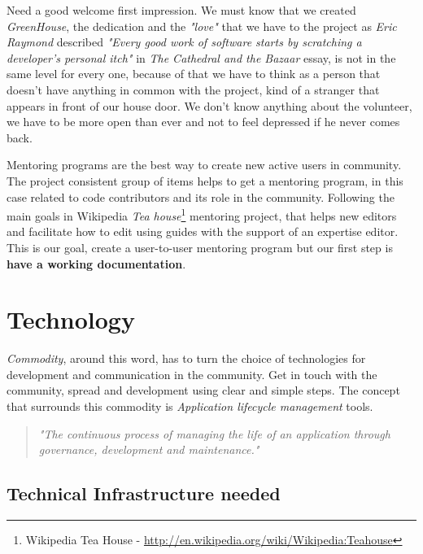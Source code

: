 \documentclass[11pt]{scrartcl}
\begin{document}
\par Need a good welcome first impression. We must know that we created \emph{GreenHouse}, the dedication and the \emph{"love"} that we have to the project as \emph{Eric Raymond} described \emph{"Every good work of software starts by scratching a developer's personal itch"} in \emph{The Cathedral and the Bazaar} essay\cite{cath-bazaar}, is not in the same level for every one, because of that we have to think as a person that doesn't have anything in common with the project, kind of a stranger that appears in front of our house door. We don't know anything about the volunteer, we have to be more open than ever and not to feel depressed if he never comes back.

\par Mentoring programs are the best way to create new active users in community. The project consistent group of items helps to get a mentoring program, in this case related to code contributors and its role in the community. Following the main goals in Wikipedia \emph{Tea house}\footnote{Wikipedia Tea House - \url{http://en.wikipedia.org/wiki/Wikipedia:Teahouse}} mentoring project, that helps new editors and facilitate how to edit using guides with the support of an expertise editor. This is our goal, create a user-to-user mentoring program but our first step is \textbf{have a working documentation}.



\section{Technology}
\label{sec:technology}

\par \emph{Commodity}, around this word, has to turn the choice of technologies for development and communication in the community. Get in touch with the community, spread and development using clear and simple steps. The concept that surrounds this commodity is \emph{Application lifecycle management} tools.

\begin{quotation}
    \emph{"The continuous process of managing the life of an application through governance, development and maintenance."}
\end{quotation}

\subsection{Technical Infrastructure needed}
\label{sub:infrastructure}
\end{document}
